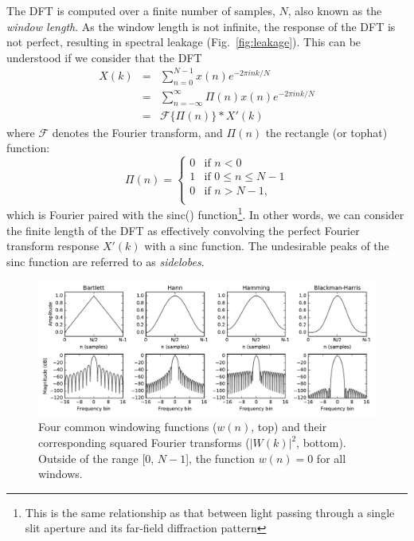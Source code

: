\documentclass{ws-rv961x669}
\begin{document}
The DFT is computed over a finite number of samples, $N$, also known as the \emph{window length}. As the window length is not infinite, the response of the DFT is not perfect, resulting in spectral leakage (Fig.~\ref{fig:leakage}). This can be understood if we consider that the DFT
\begin{eqnarray}
X(k) & = & \sum_{n=0}^{N-1}x(n)e^{-2\pi ink/N} \\
     & = &  \sum_{n=-\infty}^{\infty} \Pi (n)x(n)e^{-2\pi ink/N}\\
     & = & \mathcal{F}\{\Pi(n)\}*X'(k)
\end{eqnarray}
where $\mathcal{F}$ denotes the Fourier transform, and $\Pi(n)$ the rectangle (or tophat) function:
\begin{equation}
\Pi(n) = \begin{cases}
	0 & \mbox{if } n < 0 \\
	1 & \mbox{if } 0 \leq n \leq N-1 \\
	0 & \mbox{if } n > N-1, \\
\end{cases}	
\end{equation}
which is Fourier paired with the sinc() function\footnote{This is the same relationship as that between light passing through a single slit aperture and its far-field diffraction pattern}. In other words, we can consider the finite length of the DFT as effectively convolving the perfect Fourier transform response $X'(k)$ with a sinc function. The undesirable peaks of the sinc function are referred to as \emph{sidelobes}.

\begin{figure}[t]
 \centering
 \includegraphics[width=\textwidth]{./figures/window_fns}
 \caption{Four common windowing functions ($w(n)$, top) and their corresponding squared Fourier transforms ($|W(k)|^2$, bottom). Outside of the range [0, $N-1$], the function $w(n)=0$ for all windows. \label{fig:window_fns}}
\end{figure}
\end{document}
